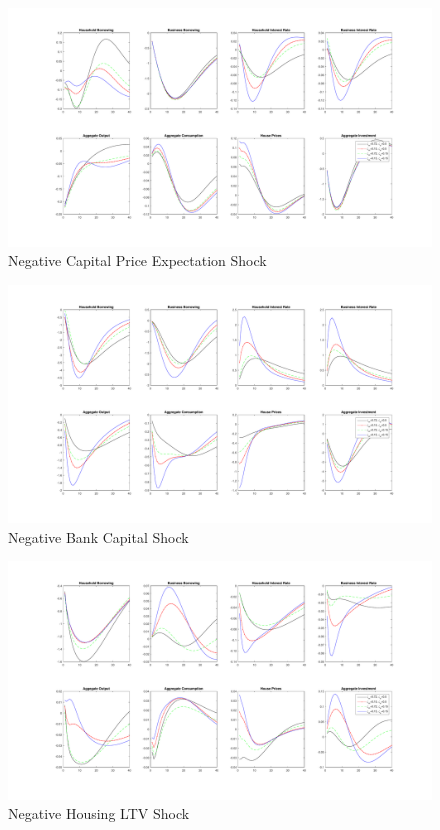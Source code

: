 \documentclass[12pt]{article}
\numberwithin{equation}{section}
\begin{document}
\begin{figure}[H]
\centering
\caption{Negative Capital Price Expectation Shock}
\includegraphics[scale=0.4]{stickinessNegativeShocksEbF.pdf}
\end{figure}

\begin{figure}[H]
\centering
\caption{Negative Bank Capital Shock}
\includegraphics[scale=0.4]{stickinessNegativeShocksECAB.pdf}
\end{figure}


\begin{figure}[H]
\centering
\caption{Negative Housing LTV Shock}
\includegraphics[scale=0.4]{stickinessNegativeShocksLTVH.pdf}
\end{figure}
\end{document}
